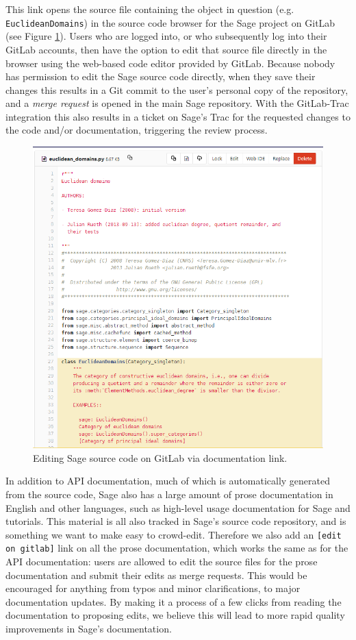 {This link opens the source file containing the object in question (e.g.~{\tt
EuclideanDomains}) in the source code browser for the Sage project on GitLab
(see Figure \ref{fig:edit-on-gitlab}).  Users who are logged into, or who
subsequently log into their GitLab accounts, then have the option to edit that
source file directly in the browser using the web-based code editor provided by
GitLab.  Because nobody has permission to edit the Sage source code
directly, when they save their changes this results in a Git commit to the
user's personal copy of the repository, and a {\em merge request} is opened in
the main Sage repository.  With the GitLab-Trac integration this also results
in a ticket on Sage's Trac for the requested changes to the code and/or
documentation, triggering the review process.

\begin{figure}[!ht]
    \centering
    \includegraphics[width=\textwidth]{screenshots/edit-on-gitlab}
    \caption{Editing Sage source code on GitLab via documentation link.}
    \label{fig:edit-on-gitlab}
\end{figure}

In addition to API documentation, much of which is automatically generated from
the source code, Sage also has a large amount of prose documentation in English
and other languages, such as high-level usage documentation for Sage and
tutorials.  This material is all also tracked in Sage's source code repository,
and is something we want to make easy to crowd-edit.  Therefore we also add an
{\tt [edit on gitlab]} link on all the prose documentation, which works the
same as for the API documentation: users are allowed to edit the source files
for the prose documentation and submit their edits as merge requests.  This
would be encouraged for anything from typos and minor clarifications, to
major documentation updates.  By making it a process of a few clicks from
reading the documentation to proposing edits, we believe this will lead
to more rapid quality improvements in Sage's documentation.


}
